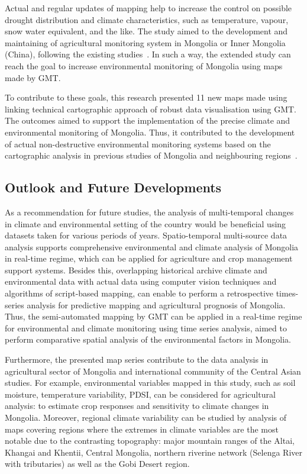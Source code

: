 \documentclass[geosciences,article,accept,pdftex,oneauthor]{Definitions/mdpi}
\begin{document}
Actual and regular updates of mapping help to increase the control on possible drought distribution and climate characteristics, such as temperature, vapour, snow water equivalent, and the like. The study aimed to the development and maintaining of agricultural monitoring system in Mongolia or Inner Mongolia (China), following the existing studies~\cite{Rina,Long,Zheng}. In such a way, the extended study can reach the goal to increase environmental monitoring of Mongolia using maps made by GMT.

To contribute to these goals, this research presented 11 new maps made using linking technical cartographic approach of robust data visualisation using GMT. The outcomes aimed to support the implementation of the precise climate and environmental monitoring of Mongolia. Thus, it contributed to the development of actual non-destructive environmental monitoring systems based on the cartographic analysis in previous studies of Mongolia and neighbouring regions~\cite{MENG2021107908,DASHPUREV2021108331,SAINNEMEKH2022104654,Batunacun}. 

\subsection{Outlook and Future Developments}
As a recommendation for future studies, the analysis of multi-temporal changes in climate and environmental setting of the country would be beneficial using datasets taken for various periods of years. Spatio-temporal multi-source data analysis supports comprehensive environmental and climate analysis of Mongolia in real-time regime, which can be applied for agriculture and crop management support systems. Besides this, overlapping historical archive climate and environmental data with actual data using computer vision techniques and algorithms of {script-based} mapping, can enable to perform a retrospective times-series analysis for predictive mapping and agricultural prognosis of Mongolia. Thus, the semi-automated mapping by GMT can be applied in a real-time regime for environmental and climate monitoring using time series analysis, {aimed to perform comparative spatial analysis of the environmental factors in Mongolia}.

Furthermore, the presented map series contribute to the data analysis in agricultural sector of Mongolia and international community of the Central Asian studies. For example, environmental variables mapped in this study, such as soil moisture, temperature variability, PDSI, can be considered for agricultural analysis: to estimate crop responses and sensitivity to climate changes in Mongolia. {Moreover, regional climate variability can be studied by analysis of maps covering regions where the extremes in climate variables are the most notable due to the contrasting topography: major mountain ranges of the Altai, Khangai and Khentii, Central Mongolia, northern riverine network (Selenga River with tributaries) as well as the Gobi Desert region.}
\end{document}
